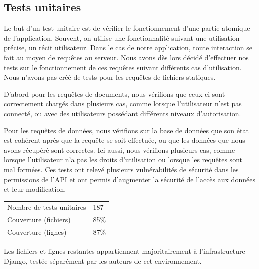 \documentclass{EPL-master-thesis-covers-FR}
\begin{document}
			\subsection*{Tests unitaires}

				Le but d'un test unitaire est de vérifier le fonctionnement d'une partie atomique de l'application. Souvent, on utilise une fonctionnalité suivant une utilisation précise, un récit utilisateur. Dans le cas de notre application, toute interaction se fait au moyen de requêtes au serveur. Nous avons dès lors décidé d'effectuer nos tests sur le fonctionnement de ces requêtes suivant différents cas d'utilisation. Nous n'avons pas créé de tests pour les requêtes de fichiers statiques.

				D'abord pour les requêtes de documents, nous vérifions que ceux-ci sont correctement chargés dans plusieurs cas, comme lorsque l'utilisateur n'est pas connecté, ou avec des utilisateurs possédant différents niveaux d'autorisation.

				Pour les requêtes de données, nous vérifions sur la base de données que son état est cohérent après que la requête se soit effectuée, ou que les données que nous avons récupéré sont correctes. Ici aussi, nous vérifions plusieurs cas, comme lorsque l'utilisateur n'a pas les droits d'utilisation ou lorsque les requêtes sont mal formées. Ces tests ont relevé plusieurs vulnérabilités de sécurité dans les permissions de l'API et ont permis d'augmenter la sécurité de l'accès aux données et leur modification.

				\begin{tabular}{l|l}
				   Nombre de tests unitaires & 187 \\
				   Couverture (fichiers) & 85\% \\
				   Couverture (lignes) & 87\% \\
				\end{tabular}

				Les fichiers et lignes restantes appartiennent majoritairement à l'infrastructure Django, testée séparément par les auteurs de cet environnement.

\end{document}
